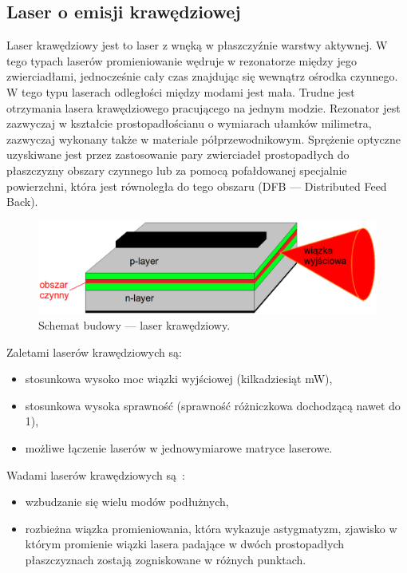 \subsection{Laser o emisji krawędziowej}
Laser krawędziowy jest to laser z wnęką w płaszczyźnie warstwy aktywnej. W tego typach laserów promieniowanie wędruje w rezonatorze między
jego zwierciadłami, jednocześnie cały czas znajdując się wewnątrz ośrodka czynnego. W tego typu laserach odległości między modami jest mała.
Trudne jest otrzymania lasera krawędziowego pracującego na jednym modzie.
Rezonator jest zazwyczaj w kształcie prostopadłościanu o wymiarach ułamków milimetra, zazwyczaj wykonany także w materiale półprzewodnikowym\cite{publikcja_nakwaski}.
Sprężenie optyczne uzyskiwane jest przez zastosowanie pary zwierciadeł prostopadłych do płaszczyzny obszary czynnego lub
za pomocą pofałdowanej specjalnie powierzchni, która jest równoległa do tego obszaru (DFB --- Distributed Feed Back).
\begin{figure}[H]
\center
\includegraphics[scale=0.25]{kraw2.eps}
\caption{Schemat budowy --- laser krawędziowy.}
\label{fig:teoria_rys_3}
\end{figure}

Zaletami laserów krawędziowych są:
\begin{itemize}
\item stosunkowa wysoko moc wiązki wyjściowej \cite{publikcja_nakwaski} (kilkadziesiąt mW),
\item stosunkowa wysoka sprawność (sprawność różniczkowa dochodzącą nawet do 1),
\item możliwe łączenie laserów w jednowymiarowe matryce laserowe.
\end{itemize}

Wadami laserów krawędziowych są~\cite{publikcja_nakwaski}:
\begin{itemize}
\item wzbudzanie się wielu modów podłużnych,
\item rozbieżna wiązka promieniowania, która wykazuje astygmatyzm, zjawisko w którym promienie wiązki lasera padające w dwóch prostopadłych
płaszczyznach zostają zogniskowane w różnych punktach.
\end{itemize}

